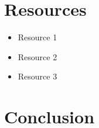 \documentclass{article}
\begin{document}
\section{Resources}

\begin{itemize}
    \item Resource 1
    \item Resource 2
    \item Resource 3
\end{itemize}

\section{Conclusion}

\lipsum[3] %
\end{document}
